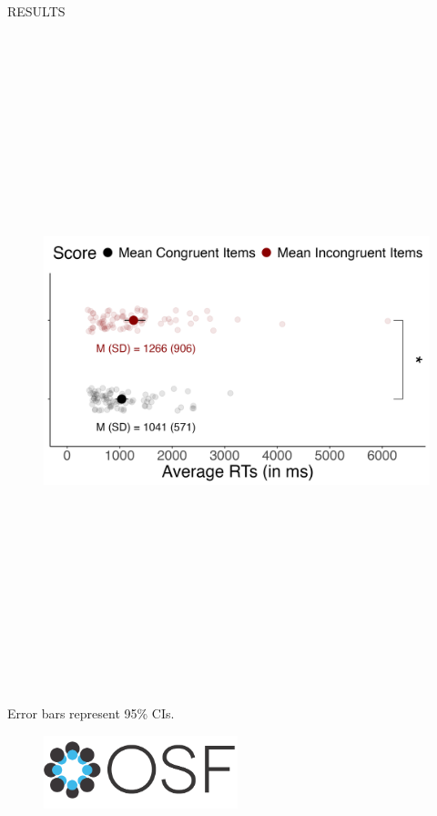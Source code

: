\documentclass[final]{beamer}
\newlength{\colwidth}
\newlength{\widecolwidth}
\begin{document}
\begin{frame}[t]
\begin{columns}[t]
\begin{column}{\widecolwidth}
  \begin{block}{RESULTS}

\begin{minipage}{0.55\textwidth}
\centering
    \begin{figure}
      \includegraphics[height=19cm]{plots/figure1.png}
    \end{figure}
{\small Error bars represent 95\% CIs.}
\end{minipage}%
\begin{minipage}{0.45\textwidth}
\begin{figure}
      \centering
      \href{https://aspredicted.org/DJG_YWR}{\includegraphics[height=2.125cm]{images/osf.png}}

\end{figure}
\end{minipage}
\end{block}
\end{column}
\end{columns}
\end{frame}
\end{document}
